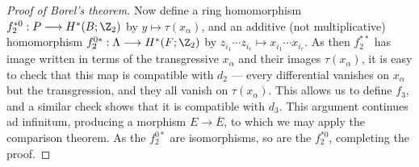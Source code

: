 \documentclass[11pt]{article}
\theoremstyle{plain}
\theoremstyle{definition}
\renewcommand{\to}{\longrightarrow}
\renewcommand{\mapsto}{\longmapsto}
\begin{document}
\begin{proof}[Proof of Borel's theorem]
Now define a ring homomorphism $f_2^{*0}:P\to H^*(B;\Z_2)$ by $y\mapsto \tau(x_\alpha)$, and an additive (not multiplicative) homomorphism $f_2^{0*}:\Lambda\to H^*(F;\Z_2)$ by $z_{i_1}\cdots z_{i_r}\mapsto x_{i_1}\cdots x_{i_r}$. As then $f_2^{**}$ has image written in terms of the transgressive $x_\alpha$ and their images $\tau(x_\alpha)$, it is easy to check that this map is compatible with $d_2$ --- every differential vanishes on $x_\alpha$ but the transgression, and they all vanish on $\tau(x_\alpha)$. This allows us to define $f_3$, and a similar check shows that it is compatible with $d_3$. This argument continues ad infinitum, producing a morphism $E\to\overline E$, to which we may apply the comparison theorem. As the $f_2^{0*}$ are isomorphisms, so are the $f_2^{*0}$, completing the proof.
%
%
\end{proof}
\end{document}
